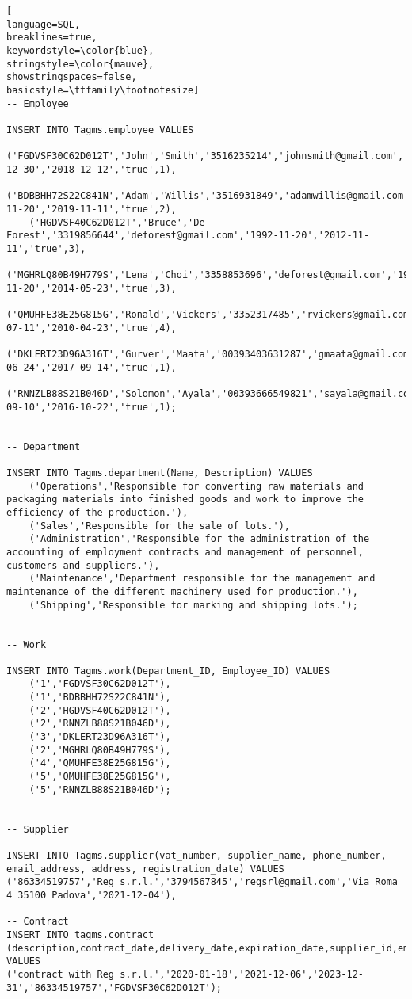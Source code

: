 \begin{lstlisting}[
language=SQL,
breaklines=true,
keywordstyle=\color{blue},
stringstyle=\color{mauve},
showstringspaces=false,
basicstyle=\ttfamily\footnotesize]
-- Employee

INSERT INTO Tagms.employee VALUES
    ('FGDVSF30C62D012T','John','Smith','3516235214','johnsmith@gmail.com','1995-12-30','2018-12-12','true',1),
    ('BDBBHH72S22C841N','Adam','Willis','3516931849','adamwillis@gmail.com','1993-11-20','2019-11-11','true',2),
    ('HGDVSF40C62D012T','Bruce','De Forest','3319856644','deforest@gmail.com','1992-11-20','2012-11-11','true',3),
    ('MGHRLQ80B49H779S','Lena','Choi','3358853696','deforest@gmail.com','1992-11-20','2014-05-23','true',3),
    ('QMUHFE38E25G815G','Ronald','Vickers','3352317485','rvickers@gmail.com','1998-07-11','2010-04-23','true',4),
    ('DKLERT23D96A316T','Gurver','Maata','00393403631287','gmaata@gmail.com','1953-06-24','2017-09-14','true',1),
    ('RNNZLB88S21B046D','Solomon','Ayala','00393666549821','sayala@gmail.com','1952-09-10','2016-10-22','true',1);


-- Department

INSERT INTO Tagms.department(Name, Description) VALUES
    ('Operations','Responsible for converting raw materials and packaging materials into finished goods and work to improve the efficiency of the production.'),
    ('Sales','Responsible for the sale of lots.'),
    ('Administration','Responsible for the administration of the accounting of employment contracts and management of personnel, customers and suppliers.'),
    ('Maintenance','Department responsible for the management and maintenance of the different machinery used for production.'),
    ('Shipping','Responsible for marking and shipping lots.');


-- Work

INSERT INTO Tagms.work(Department_ID, Employee_ID) VALUES
    ('1','FGDVSF30C62D012T'),
    ('1','BDBBHH72S22C841N'),
    ('2','HGDVSF40C62D012T'),
    ('2','RNNZLB88S21B046D'),
    ('3','DKLERT23D96A316T'),
    ('2','MGHRLQ80B49H779S'),
    ('4','QMUHFE38E25G815G'),
    ('5','QMUHFE38E25G815G'),
    ('5','RNNZLB88S21B046D');


-- Supplier

INSERT INTO Tagms.supplier(vat_number, supplier_name, phone_number, email_address, address, registration_date) VALUES
('86334519757','Reg s.r.l.','3794567845','regsrl@gmail.com','Via Roma 4 35100 Padova','2021-12-04'),

-- Contract
INSERT INTO tagms.contract (description,contract_date,delivery_date,expiration_date,supplier_id,employee_id) VALUES
('contract with Reg s.r.l.','2020-01-18','2021-12-06','2023-12-31','86334519757','FGDVSF30C62D012T');


\end{lstlisting}

